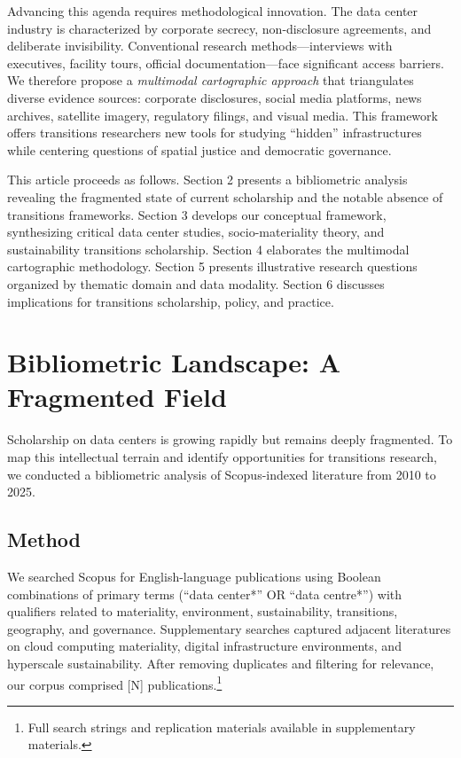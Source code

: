 \documentclass[review]{elsarticle}
\begin{document}
Advancing this agenda requires methodological innovation. The data center industry is characterized by corporate secrecy, non-disclosure agreements, and deliberate invisibility. Conventional research methods---interviews with executives, facility tours, official documentation---face significant access barriers. We therefore propose a \textit{multimodal cartographic approach} that triangulates diverse evidence sources: corporate disclosures, social media platforms, news archives, satellite imagery, regulatory filings, and visual media. This framework offers transitions researchers new tools for studying ``hidden'' infrastructures while centering questions of spatial justice and democratic governance.

This article proceeds as follows. Section 2 presents a bibliometric analysis revealing the fragmented state of current scholarship and the notable absence of transitions frameworks. Section 3 develops our conceptual framework, synthesizing critical data center studies, socio-materiality theory, and sustainability transitions scholarship. Section 4 elaborates the multimodal cartographic methodology. Section 5 presents illustrative research questions organized by thematic domain and data modality. Section 6 discusses implications for transitions scholarship, policy, and practice.

\section{Bibliometric Landscape: A Fragmented Field}

Scholarship on data centers is growing rapidly but remains deeply fragmented. To map this intellectual terrain and identify opportunities for transitions research, we conducted a bibliometric analysis of Scopus-indexed literature from 2010 to 2025.

\subsection{Method}

We searched Scopus for English-language publications using Boolean combinations of primary terms (``data center*'' OR ``data centre*'') with qualifiers related to materiality, environment, sustainability, transitions, geography, and governance. Supplementary searches captured adjacent literatures on cloud computing materiality, digital infrastructure environments, and hyperscale sustainability. After removing duplicates and filtering for relevance, our corpus comprised [N] publications.\footnote{Full search strings and replication materials available in supplementary materials.}
\end{document}
